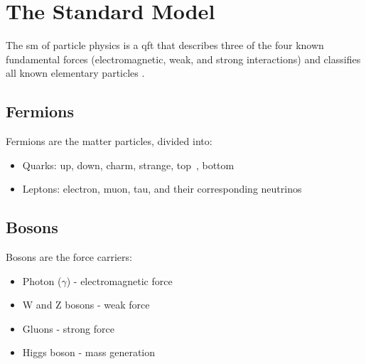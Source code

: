 \section{The Standard Model}
\label{sec:INTRODUCTION_THE_STANDARD_MODEL}

The \gls{sm} of particle physics is a \gls{qft} that describes three of the four known fundamental forces (electromagnetic, weak, and strong interactions) and classifies all known elementary particles \cite{standardmodel}.

\subsection{Fermions}
\label{sec:INTRODUCTION_THE_STANDARD_MODEL_FERMIONS}

Fermions are the matter particles, divided into:
\begin{itemize}
  \item Quarks: up, down, charm, strange, top~\cite{top-discovery}, bottom
  \item Leptons: electron, muon, tau, and their corresponding neutrinos
\end{itemize}

\subsection{Bosons}
\label{sec:INTRODUCTION_THE_STANDARD_MODEL_BOSONS}

Bosons are the force carriers:
\begin{itemize}
  \item Photon ($\gamma$) - electromagnetic force
  \item W and Z bosons - weak force~\cite{w-boson,z-boson}
  \item Gluons - strong force
  \item Higgs boson - mass generation~\cite{higgs1964,higgs-discovery,cms-higgs}
\end{itemize}

